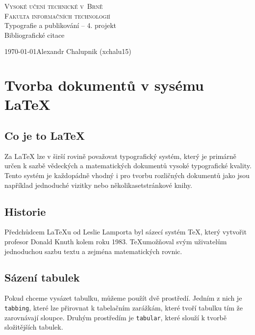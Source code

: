 \documentclass[11pt, a4paper]{article}
\begin{document}
\begin{titlepage}
    \begin{center}
        \Huge{\textsc{Vysoké učení technické v~Brně}}\\
        \huge{\textsc{Fakulta informačních technologií}}\\
        \LARGE{Typografie a publikování -- 4. projekt}\\
        \Huge{Bibliografické citace}\\
    \end{center}
    {\Large \today \hfill Alexandr Chalupnik (xchalu15)}
\end{titlepage}

\section{Tvorba dokumentů v sysému \LaTeX{}}
\subsection{Co je to \LaTeX{}}
Za LaTeX lze v širší rovině považovat typografický systém, který je primárně určen k sazbě vědeckých a matematických dokumentů vysoké typografické kvality. Tento systém je každopádně vhodný i pro tvorbu rozličných dokumentů jako jsou například jednoduché vizitky nebo několikasetstránkové knihy.\cite{web:medium}

\subsection{Historie}
Předchůdcem \LaTeX{}u od Leslie Lamporta byl sázecí systém \TeX, který vytvořit profesor Donald Knuth kolem roku 1983. \TeX umožňoval svým uživatelům jednoduchou sazbu textu a zejména matematických rovnic. \cite{thesis:history} 

\subsection{Sázení tabulek}
Pokud chceme vysázet tabulku, můžeme použít dvě prostředí. Jedním z nich je \verb|tabbing|, které lze přirovnat k tabelačním zarážkám, které tvoří tabulku tím že zarovnávají sloupce. Druhým prostředím je \verb|tabular|, které slouží k tvorbě složitějších tabulek. \cite{web:table}
\end{document}
